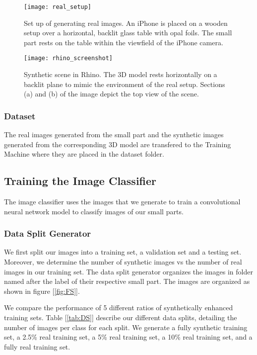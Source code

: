 \begin{figure}[H]
\centering
  \texttt{[image: real\_setup]}
\caption{Set up of generating real images. An iPhone is placed on a wooden setup over a horizontal, backlit glass table with opal foils. The small part rests on the table within the viewfield of the iPhone camera.}
\label{fig:RealSetup}
\end{figure}

\begin{figure}[H]
\centering
  \texttt{[image: rhino\_screenshot]}
\caption{Synthetic scene in Rhino. The 3D model rests horizontally on a backlit plane to mimic the environment of the real setup. Sections (a) and (b) of the image depict the top view of the scene.}
\label{fig:RhinoScreenshot}
\end{figure}

\subsubsection{Dataset}
The real images generated from the small part and the synthetic images generated from the corresponding 3D model are transfered to the Training Machine where they are placed in the dataset folder.

\subsection{Training the Image Classifier}
The image classifier uses the images that we generate to train a convolutional neural network model to classify images of our small parts.

\subsubsection{Data Split Generator}
We first split our images into a training set, a validation set and a testing set. Moreover, we determine the number of synthetic images vs the number of real images in our training set. The data split generator organizes the images in folder named after the label of their respective small part. The images are organized as shown in figure [\ref{fig:FS}].

We compare the performance of 5 different ratios of synthetically enhanced training sets. Table [\ref{tab:DS}] describe our different data splits, detailing the number of images per class for each split. We generate a fully synthetic training set, a 2.5\% real training set, a 5\% real training set, a 10\% real training set, and a fully real training set. 

